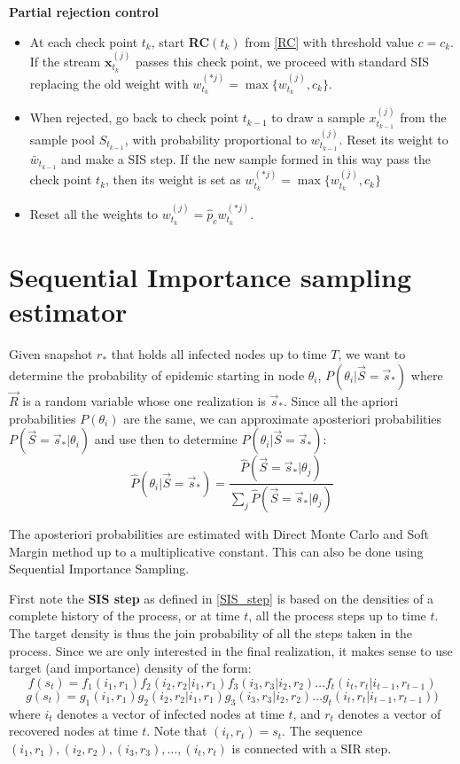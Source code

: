 \documentclass[times, utf8, diplomski]{fer}
\begin{document}
\textbf{Partial rejection control}
\begin{itemize}
\item{At each check point $t_k$, start \textbf{RC}$(t_k)$ from \ref{RC} with threshold value $c=c_k$. If the stream $\mathbf{x}_{t_k}^{(j)}$ passes this check point, we proceed with standard SIS replacing the old weight with $w_{t_k}^{(*j)} = \max \{w_{t_k}^{(j)}, c_k\}$.}
\item{When rejected, go back to check point $t_{k - 1}$ to draw a sample $x_{t_{k - 1}}^{(j)}$ from the sample pool $S_{t_{k - 1}}$, with probability proportional to $w_{t_{k - 1}}^{(j)}$. Reset its weight to $\bar{w}_{t_{k - 1}}$ and make a SIS step. If the new sample formed in this way pass the check point $t_k$, then its weight is set as $w_{t_k}^{(*j)} = \max \{w_{t_k}^{(j)}, c_k \} $}
\item{Reset all the weights to $w_{t_k}^{(j)} = \hat{p}_c w_{t_k}^{(*j)}$.}
\end{itemize}

\section{Sequential Importance sampling estimator}
Given snapshot $r_*$ that holds all infected nodes up to time $T$, we want to determine the probability  of epidemic starting in node $\theta_i$, $P(\theta_i | \vec S = \vec s_*)$ where $\vec R$ is a random variable whose one realization is $\vec s_*$.   Since all the apriori probabilities $P(\theta_i)$ are the same, we can approximate aposteriori probabilities $P(\vec S = \vec s_* | \theta_i)$ and use then to determine $P(\theta_i | \vec S = \vec s_*)$:
\begin{equation*}
\hat{P}(\theta_i | \vec S = \vec s_*) = \frac{\hat{P}(\vec S = \vec s_* | \theta_j)}{\sum_j \hat{P}(\vec S = \vec s_* | \theta_j)}
\end{equation*}

The aposteriori probabilities are estimated with Direct Monte Carlo and Soft Margin method up to a multiplicative constant. This can also be done using Sequential Importance Sampling.

First note the \textbf{SIS step} as defined in \ref{SIS_step} is based on the densities of a complete history of the process, or at time $t$, all the process steps up to time $t$. The target density is thus the join probability of all the steps taken in the process. Since we are only interested  in the final realization, it makes sense to use target (and importance) density of the form:
\begin{equation*}
f(s_t) = f_1(i_1, r_1) f_2(i_2, r_2 | i_1, r_1)  f_3(i_3, r_3 | i_2, r_2)  \ldots  f_t(i_t, r_t | i_{t - 1}, r_{t - 1})
\end{equation*}
\begin{equation*}
g(s_t) = g_1(i_1, r_1) g_2(i_2, r_2 | i_1, r_1) g_3(i_3, r_3 | i_2, r_2) \ldots  g_t(i_t, r_t | i_{t - 1}, r_{t - 1}))
\end{equation*}
where $i_t$ denotes a vector of infected nodes at time $t$, and $r_t$ denotes a vector of recovered nodes at time $t$. Note that $(i_t, r_t) = s_t$. The sequence $(i_1, r_1), (i_2, r_2), (i_3, r_3), \ldots, (i_t, r_t)$ is connected with a SIR step.
\end{document}
